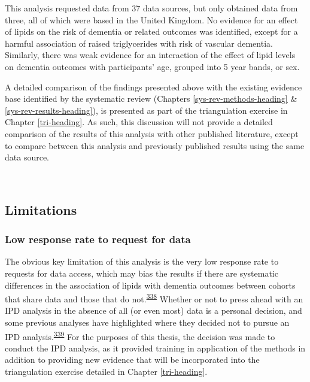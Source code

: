 \documentclass[a4paper, twoside]{templates/ociamthesis}
\begin{document}
This analysis requested data from 37 data sources, but only obtained data from three, all of which were based in the United Kingdom. No evidence for an effect of lipids on the risk of dementia or related outcomes was identified, except for a harmful association of raised triglycerides with risk of vascular dementia. Similarly, there was weak evidence for an interaction of the effect of lipid levels on dementia outcomes with participants' age, grouped into 5 year bands, or sex.

A detailed comparison of the findings presented above with the existing evidence base identified by the systematic review (Chapters \ref{sys-rev-methods-heading} \& \ref{sys-rev-results-heading}), is presented as part of the triangulation exercise in Chapter \ref{tri-heading}. As such, this discussion will not provide a detailed comparison of the results of this analysis with other published literature, except to compare between this analysis and previously published results using the same data source.

~

\hypertarget{limitations-1}{%
\subsection{Limitations}\label{limitations-1}}

\hypertarget{low-response-rate-to-request-for-data}{%
\subsubsection{Low response rate to request for data}\label{low-response-rate-to-request-for-data}}

The obvious key limitation of this analysis is the very low response rate to requests for data access, which may bias the results if there are systematic differences in the association of lipids with dementia outcomes between cohorts that share data and those that do not.\textsuperscript{\protect\hyperlink{ref-ahmed2012}{338}} Whether or not to press ahead with an IPD analysis in the absence of all (or even most) data is a personal decision, and some previous analyses have highlighted where they decided not to pursue an IPD analysis.\textsuperscript{\protect\hyperlink{ref-jaspers2014}{339}} For the purposes of this thesis, the decision was made to conduct the IPD analysis, as it provided training in application of the methods in addition to providing new evidence that will be incorporated into the triangulation exercise detailed in Chapter \ref{tri-heading}.
\end{document}
